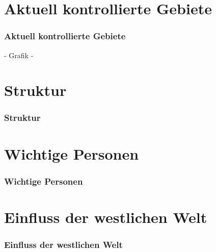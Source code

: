 \documentclass{beamer}
\begin{document}
\section{Aktuell kontrollierte Gebiete}
\begin{frame}
\frametitle{Aktuell kontrollierte Gebiete}
 - Grafik  -
\end{frame}


\section{Struktur}
\begin{frame}
\frametitle{Struktur}
\end{frame}

\section{Wichtige Personen}
\begin{frame}
\frametitle{Wichtige Personen}
\end{frame}


\section{Einfluss der westlichen Welt}
\begin{frame}
\frametitle{Einfluss der westlichen Welt}
\end{frame}
\end{document}

